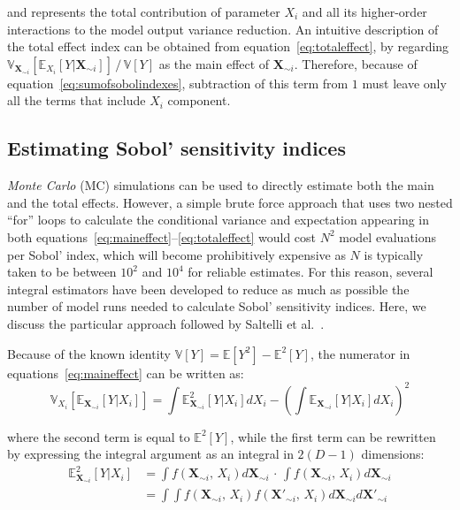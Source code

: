 \noindent
and represents the total contribution of parameter $X_i$ and all its higher-order interactions to the model output variance reduction. An intuitive description of the total effect index can be obtained from equation~\eqref{eq:totaleffect}, by regarding $\mathbb{V}_{\mathbf{X}_{\sim i}}[\mathbb{E}_{X_i}[Y|\mathbf{X}_{\sim i}]]\,/\,\mathbb{V}[Y]$ as the main effect of $\mathbf{X}_{\sim i}$. Therefore, because of equation~\eqref{eq:sumofsobolindexes}, subtraction of this term from $1$ must leave only all the terms that include $X_i$ component.

%
%
%
\subsection{Estimating Sobol' sensitivity indices}\label{sec:ch3estimatingsobolsensitivityindices}
\textit{Monte Carlo} (\acs{MC}) simulations can be used to directly estimate both the main and the total effects. However, a simple brute force approach that uses two nested \enquote{for} loops to calculate the conditional variance and expectation appearing in both equations~\eqref{eq:maineffect}--\eqref{eq:totaleffect} would cost $N^2$ model evaluations per Sobol' index, which will become prohibitively expensive as $N$ is typically taken to be between $10^2$ and $10^4$ for reliable estimates. For this reason, several integral estimators have been developed to reduce as much as possible the number of model runs needed to calculate Sobol' sensitivity indices. Here, we discuss the particular approach followed by Saltelli et al.~\cite{Saltelli:2010}.

\vspace{0.2cm}
Because of the known identity $\mathbb{V}[Y] = \mathbb{E}[Y^2] - \mathbb{E}^2[Y]$, the numerator in equations~\eqref{eq:maineffect} can be written as:
%
\begin{equation}
    \mathbb{V}_{X_i}[\mathbb{E}_{\mathbf{X}_{\sim i}}[Y|X_i]] = \int \mathbb{E}^2_{\mathbf{X}_{\sim i}}[Y|X_i]dX_i - \left(\int \mathbb{E}_{\mathbf{X}_{\sim i}}[Y|X_i]dX_i\right)^2
\end{equation}

\noindent
where the second term is equal to $\mathbb{E}^2[Y]$, while the first term can be rewritten by expressing the integral argument as an integral in $2(D - 1)$ dimensions:
%
\begin{align}
    \mathbb{E}^2_{\mathbf{X}_{\sim i}}[Y|X_i] &= \int f(\mathbf{X}_{\sim i},\, X_i)d\mathbf{X}_{\sim i}\,\cdot\,\int f(\mathbf{X}_{\sim i},\, X_i)d\mathbf{X}_{\sim i} \\
    &= \int\int f(\mathbf{X}_{\sim i},\, X_i)f(\mathbf{X'}_{\sim i},\, X_i)d\mathbf{X}_{\sim i}d\mathbf{X'}_{\sim i}
\end{align}

